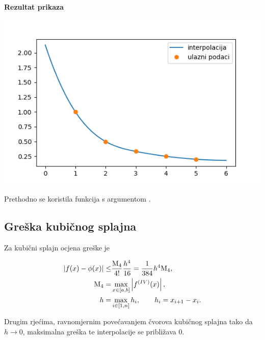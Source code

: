 \begin{multicols}{2}
    

    \columnbreak

    \textbf{Rezultat prikaza}

    \includegraphics[width=\linewidth]{fig/kub_splajn.png}
\end{multicols}

Prethodno se koristila  funkcija s argumentom .

\subsection{Greška kubičnog splajna}

Za kubični splajn ocjena greške je

\begin{align*}
|f(x)-\phi(x)|\leq&\frac{\text{M}_4}{4!}\frac{h^4}{16}={1\over384}h^4\text{M}_4,\\
\text{M}_4=&\max_{x\in[a,b]}\left|f^{(IV)}(x)\right|,\\
h=&\max_{i\in[1,n]}h_i,\qquad h_i=x_{i+1}-x_i.
\end{align*}

Drugim rjećima, ravnomjernim povećavanjem čvorova kubičnog splajna tako da $h\to0$, maksimalna greška te interpolacije se približava 0.
